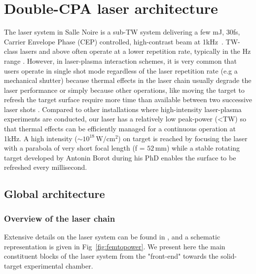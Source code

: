 \chapter{Double-CPA laser architecture}
\label{chapter:Overall presentation of the laser system}
\minitoc
\thispagestyle{empty}

The laser system in Salle Noire is a sub-TW system delivering a few mJ, 30fs, Carrier Envelope Phase (CEP) controlled, high-contrast beam at 1kHz~\cite{Jullien}. TW-class lasers and above often operate at a lower repetition rate, typically in the Hz range \cite{yanovsky2008ultra,malka2002electron,loupias2007plasma}. However, in laser-plasma interaction schemes,  it is very common that users operate in single shot mode regardless of the laser repetition rate (e.g a mechanical shutter) because thermal effects in the laser chain usually degrade the laser performance or simply because other operations, like moving the target to refresh the target surface require more time than available between two successive laser shots \cite{quere2008phase}. Compared to other installations where high-intensity laser-plasma experiments are conducted, our laser has a relatively low peak-power (<TW) so that thermal effects can be efficiently managed for a continuous operation at 1kHz. A high intensity ($\sim 10^{18}\,\mathrm{W/cm^2}$) on target is reached by focusing the laser with a parabola of very short focal length (f = $52\,\mathrm{mm}$) while a stable rotating target developed by Antonin Borot during his PhD\cite{theseAnto} enables the surface to be refreshed every millisecond.

\section{Global architecture}
\subsection{Overview of the laser chain}
Extensive details on the laser system can be found in \cite{TheseRicci,TheseTrisorio,TheseCanova}, and a schematic representation is given in Fig~\ref{fig:femtopower}. We present here the main constituent blocks of the laser system from the "front-end" towards the solid-target experimental chamber. \\


